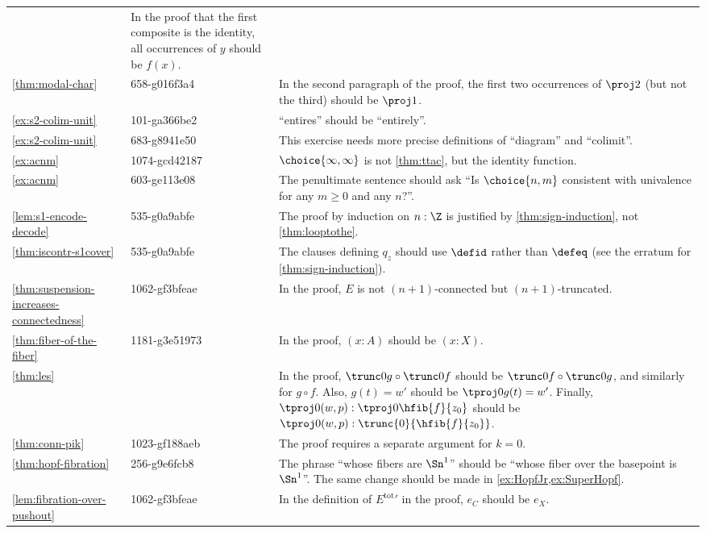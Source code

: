 \documentclass[
%
%
11pt %
]{article}
\begin{document}
\begin{longtable}{llp{10.5cm}}
  & In the proof that the first composite is the identity, all occurrences of $y$ should be $f(x)$.\\
  \cref{thm:modal-char}
  & 658-g016f3a4
  & In the second paragraph of the proof, the first two occurrences of $\proj2$ (but not the third) should be $\proj1$.\\
  \cref{ex:s2-colim-unit}
  & 101-ga366be2
  & ``entires'' should be ``entirely''.\\
  \cref{ex:s2-colim-unit}
  & 683-g8941e50
  & This exercise needs more precise definitions of ``diagram'' and ``colimit''.\\
  \cref{ex:acnm}
  & 1074-gcd42187
  & $\choice{\infty,\infty}$ is not \cref{thm:ttac}, but the identity function.\\
  \cref{ex:acnm}
  & 603-ge113e08
  & The penultimate sentence should ask ``Is $\choice{n,m}$ consistent with univalence for any $m\ge 0$ and any $n$?''.\\
  \cref{lem:s1-encode-decode}
  & 535-g0a9abfe
  & The proof by induction on $n:\Z$ is justified by \cref{thm:sign-induction}, not \cref{thm:looptothe}.\\
  \cref{thm:iscontr-s1cover}
  & 535-g0a9abfe
  & The clauses defining $q_z$ should use $\defid$ rather than $\defeq$ (see the erratum for \cref{thm:sign-induction}).\\
  \cref{thm:suspension-increases-connectedness}
  & 1062-gf3bfeae
  & In the proof, $E$ is not $(n + 1)$-connected but $(n + 1)$-truncated.\\
  \cref{thm:fiber-of-the-fiber}
  & 1181-g3e51973
  & In the proof, $(x:A)$ should be $(x:X)$.\\
  \cref{thm:les}
  & %
  & In the proof, $\trunc0g\circ\trunc0f$ should be $\trunc0f\circ\trunc0g$, and similarly for $g\circ f$.
  Also, $g(t)=w'$ should be $\tproj0{g(t)}=w'$.
  Finally, $\tproj0{(w,p)}:\tproj0{\hfib{f}{z_0}}$ should be $\tproj0{(w,p)}:\trunc{0}{\hfib{f}{z_0}}$.\\
  \cref{thm:conn-pik}
  & 1023-gf188aeb
  & The proof requires a separate argument for $k=0$.\\
  \cref{thm:hopf-fibration}
  & 256-g9e6fcb8
  & The phrase ``whose fibers are $\Sn^1$'' should be ``whose fiber over the basepoint is $\Sn ^1$''.
  The same change should be made in \cref{ex:HopfJr,ex:SuperHopf}.\\
  \cref{lem:fibration-over-pushout}
  & 1062-gf3bfeae
  & In the definition of ${E^{\mathrm{tot}}}'$ in the proof, $e_C$ should be $e_X$.\\

\end{longtable}
\end{document}

